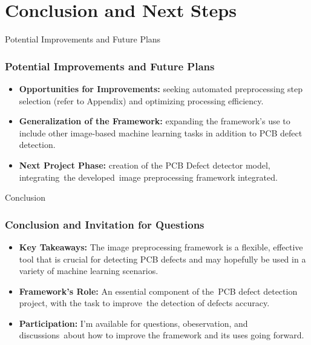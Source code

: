 \section{Conclusion and Next Steps}
\label{conclusion_section}


\begin{frame}{Potential Improvements and Future Plans}
    \frametitle{Potential Improvements and Future Plans}
    \begin{itemize}
        \item \textbf{Opportunities for Improvements:} seeking automated preprocessing step selection (refer to Appendix) and optimizing processing efficiency.
        \item \textbf{Generalization of the Framework:} expanding the framework's use to include other image-based machine learning tasks in addition to PCB defect detection.
        \item \textbf{Next Project Phase:} creation of the PCB Defect detector model, integrating the developed image preprocessing framework integrated.
    \end{itemize}
\end{frame}

\begin{frame}{Conclusion}
    \frametitle{Conclusion and Invitation for Questions}
    \begin{itemize}
        \item \textbf{Key Takeaways:} The image preprocessing framework is a flexible, effective tool that is crucial for detecting PCB defects and may hopefully be used in a variety of machine learning scenarios.
        \item \textbf{Framework's Role:} An essential component of the PCB defect detection project, with the task to improve the detection of defects accuracy.
        \item \textbf{Participation:} I'm available for questions, obeservation, and discussions about how to improve the framework and its uses going forward.
    \end{itemize}
\end{frame}
